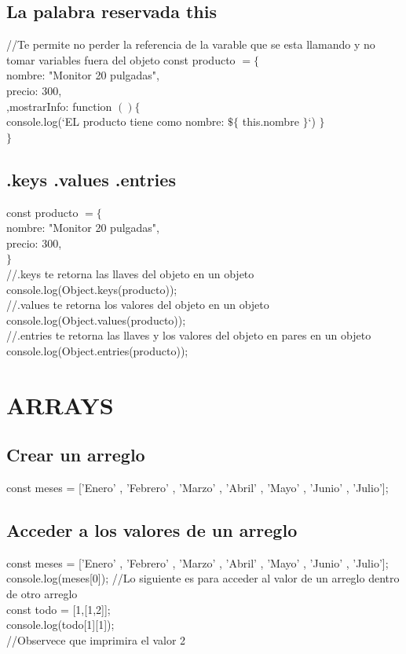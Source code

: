 \documentclass[10pt,a4paper]{article}
\begin{document}
\subsection{La palabra reservada this}
//Te permite no perder la referencia de la varable que se esta llamando y no tomar variables fuera del objeto
const producto  $ = \{ $  \\ nombre: "Monitor 20 pulgadas", \\ precio: 300, \\  ,mostrarInfo: function $ \left(  \right) \{$ \\
console.log(`EL producto tiene como nombre: $ \$ \{ $ this.nombre  $ \} $`) $ \} $ \\ $ \} $ \\ 
\newpage
\subsection{.keys .values .entries} 
const producto  $ = \{ $  \\ nombre: "Monitor 20 pulgadas", \\ precio: 300, \\  $ \} $ \\ 
//.keys te retorna las llaves del objeto en un objeto \\
console.log(Object.keys(producto)); \\
//.values te retorna los valores del objeto en un objeto \\
console.log(Object.values(producto)); \\
//.entries te retorna las llaves y los valores del objeto en pares en  un objeto \\
console.log(Object.entries(producto)); \\

\newpage
\section{ARRAYS}
\subsection{Crear un arreglo} 
const meses = ['Enero' , 'Febrero' , 'Marzo' , 'Abril' , 'Mayo' , 'Junio' , 'Julio']; \\
\subsection{Acceder a los valores de un arreglo} 
const meses = ['Enero' , 'Febrero' , 'Marzo' , 'Abril' , 'Mayo' , 'Junio' , 'Julio']; \\
console.log(meses[0]);
//Lo siguiente es para acceder al valor de un arreglo dentro de otro arreglo\\
const todo = [1,[1,2]]; \\
console.log(todo[1][1]); \\
//Observece que imprimira el valor 2\\
\end{document}

